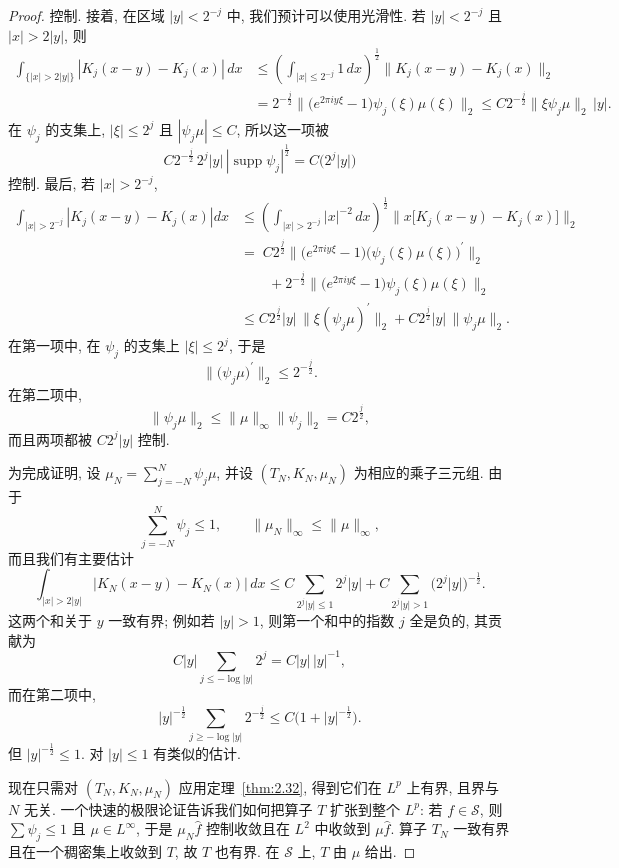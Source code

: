 \begin{proof}
控制. 接着, 在区域 $|y|<2^{-j}$ 中, 我们预计可以使用光滑性. 若 $|y|<2^{-j}$ 且 $|x|>2|y|$, 则
\begin{align*}
\int_{\{|x|>2|y|\}}|K_{j}(x-y)-K_{j}(x)|\,dx
&\leq\left(\int_{|x|\leq 2^{-j}}1\,dx\right)^{\frac{1}{2}}\|K_{j}(x-y)-K_{j}(x)\|_{2} \\
&=2^{-\frac{j}{2}}\bigl\|\bigl(e^{2\pi iy\xi}-1\bigr)\psi_{j}(\xi)\mu(\xi)\bigr\|_{2}
\leq C2^{-\frac{j}{2}}\|\xi\psi_{j}\mu\|_{2}\,|y|.
\end{align*}
在 $\psi_j$ 的支集上, $|\xi|\leq 2^j$ 且 $|\psi_j\mu|\leq C$, 所以这一项被
\[
C2^{-\frac{j}{2}}\,2^{j}|y|\,|\operatorname{supp}\psi_{j}|^{\frac{1}{2}}=C\bigl(2^{j}|y|\bigr)
\]
控制. 最后, 若 $|x|>2^{-j}$,
\begin{align*}
\int_{|x|>2^{-j}}\left|K_{j}(x-y)-K_{j}(x)\right|dx
&\leq\left(\int_{|x|>2^{-j}}|x|^{-2}\,dx\right)^{\frac{1}{2}}\bigl\|x\bigl[K_{j}(x-y)-K_{j}(x)\bigr]\bigr\|_{2} \\
&=\;C2^{\frac{j}{2}}\bigl\|\bigl(e^{2\pi iy\xi}-1\bigr)\bigl(\psi_{j}(\xi)\mu(\xi)\bigr)^{\prime}\bigr\|_{2} \\
&\qquad+2^{-\frac{j}{2}}\bigl\|\bigl(e^{2\pi iy\xi}-1\bigr)\psi_{j}(\xi)\mu(\xi)\bigr\|_{2} \\
&\leq C2^{\frac{j}{2}}|y|\,\bigl\|\xi(\psi_{j}\mu)^{\prime}\bigr\|_{2}+C2^{\frac{j}{2}}|y|\,\|\psi_{j}\mu\|_{2}.
\end{align*}
在第一项中, 在 $\psi_j$ 的支集上 $|\xi|\leq 2^j$, 于是
\[
\bigl\|\bigl(\psi_{j}\mu\bigr)^{\prime}\bigr\|_{2}\leq 2^{-\frac{j}{2}}.
\]
在第二项中,
\[
\|\psi_{j}\mu\|_{2}\leq\|\mu\|_{\infty}\|\psi_{j}\|_{2}=C2^{\frac{j}{2}},
\]
而且两项都被 $C2^{j}|y|$ 控制.

为完成证明, 设 $\mu_N=\sum_{j=-N}^{N}\psi_j\mu$, 并设 $(T_N,K_N,\mu_N)$ 为相应的乘子三元组. 由于
\[
\sum_{j=-N}^{N}\psi_{j}\leq 1,\qquad\|\mu_{N}\|_{\infty}\leq\|\mu\|_{\infty},
\]
而且我们有主要估计
\[
\int_{|x|>2|y|}|K_{N}(x-y)-K_{N}(x)|\,dx
\leq C\sum_{2^{j}|y|\leq 1}2^{j}|y|+C\sum_{2^{j}|y|>1}\bigl(2^{j}|y|\bigr)^{-\frac{1}{2}}.
\]
这两个和关于 $y$ 一致有界; 例如若 $|y|>1$, 则第一个和中的指数 $j$ 全是负的, 其贡献为
\[
C|y|\sum_{j\leq-\log|y|}2^{j}=C|y|\,|y|^{-1},
\]
而在第二项中,
\[
|y|^{-\frac{1}{2}}\sum_{j\geq-\log|y|}2^{-\frac{j}{2}}
\leq C\bigl(1+|y|^{-\frac{1}{2}}\bigr).
\]
但 $|y|^{-\frac{1}{2}}\leq 1$. 对 $|y|\leq 1$ 有类似的估计.

现在只需对 $(T_N,K_N,\mu_N)$ 应用定理~\ref{thm:2.32}, 得到它们在 $L^p$ 上有界, 且界与 $N$ 无关. 一个快速的极限论证告诉我们如何把算子 $T$ 扩张到整个 $L^p$: 若 $f\in\mathcal{S}$, 则 $\sum\psi_j\leq 1$ 且 $\mu\in L^\infty$, 于是 $\mu_N\hat{f}$ 控制收敛且在 $L^2$ 中收敛到 $\mu\hat{f}$. 算子 $T_N$ 一致有界且在一个稠密集上收敛到 $T$, 故 $T$ 也有界. 在 $\mathcal{S}$ 上, $T$ 由 $\mu$ 给出.
\end{proof}

